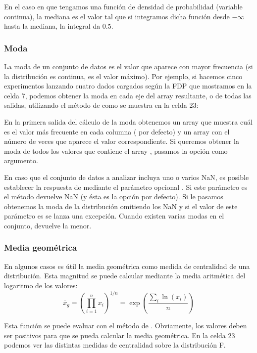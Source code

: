 En el caso en que tengamos una función de densidad de probabilidad (variable continua), la mediana es el valor tal que si integramos dicha función desde $-\infty$ hasta la mediana, la integral da $0.5$.


\subsubsection{Moda}
La moda de un conjunto de datos es el valor que aparece con mayor frecuencia (si la distribución es continua, es el valor máximo). Por ejemplo, si hacemos cinco experimentos lanzando cuatro dados cargados según la FDP que mostramos en la celda 7, podemos obtener la moda en cada eje del array resultante, o de todas las salidas, utilizando el método  de  como se muestra en la celda 23:


En la primera salida del cálculo de la moda obtenemos un array que muestra cuál es el valor más frecuente en cada columna ( por defecto) y un array con el número de veces que aparece
el valor correspondiente. Si queremos obtener la moda de todos los valores que contiene el array , pasamos la opción  como argumento.

En caso que el conjunto de datos a analizar incluya uno o varios NaN, es posible establecer la respuesta de  mediante el parámetro opcional . Si este parámetro es  el método  devuelve NaN (y ésta es la opción por defecto). Si le pasamos  obtenemos la moda de la distribución omitiendo los NaN y si el valor de este parámetro es  se lanza una excepción. Cuando existen varias modas en el conjunto,  devuelve la menor.

\subsubsection{Media geométrica}

En algunos casos es útil la media geométrica como medida de centralidad de una distribución. Esta magnitud se puede calcular mediante la media aritmética del logaritmo de los valores:
\[ \bar{x}_g = \left( \prod_{i=1}^n x_i \right)^{1/n} = \exp \left( \frac{\sum_i \ln(x_i)}{n} \right) \]

Esta función se puede evaluar con el método  de . Obviamente, los valores deben ser positivos para que se pueda calcular la media geométrica. En la celda 23 podemos ver las distintas medidas de centralidad sobre la distribución F.

